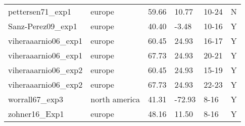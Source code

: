\documentclass{article}
\begin{document}
\begin{footnotesize}
\begin{tabular}{|p{}|p{}|p{}|p{}|p{}|p{}|}
  pettersen71\_exp1 & europe & 59.66 & 10.77 & 10-24 & N \\ 
  Sanz-Perez09\_exp1 & europe & 40.40 & -3.48 & 10-16 & Y \\ 
  viheraaarnio06\_exp1 & europe & 60.45 & 24.93 & 16-17 & Y \\ 
  viheraaarnio06\_exp1 & europe & 67.73 & 24.93 & 20-21 & Y \\ 
  viheraaarnio06\_exp2 & europe & 60.45 & 24.93 & 15-19 & Y \\ 
  viheraaarnio06\_exp2 & europe & 67.73 & 24.93 & 22-23 & Y \\ 
  worrall67\_exp3 & north america & 41.31 & -72.93 & 8-16 & Y \\ 
  zohner16\_Exp1 & europe & 48.16 & 11.50 & 8-16 & Y \\ 
   \hline
\end{tabular}
\endgroup\end{footnotesize} 
\end{document}
